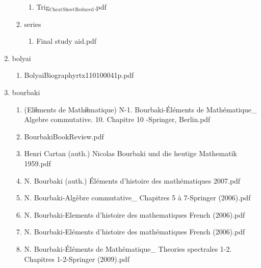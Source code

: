 \documentclass[11pt]{article}
\begin{document}
\begin{enumerate}
\begin{enumerate}
\begin{enumerate}
\item Trig$_{\text{Cheat}}$$_{\text{Sheet}}$$_{\text{Reduced}}$.pdf
\label{sec-1-1-1-1-29-22-20-15}
\end{enumerate}

\item series
\label{sec-1-1-1-1-29-22-21}
\begin{enumerate}
\item Final study aid.pdf
\label{sec-1-1-1-1-29-22-21-1}
\end{enumerate}
\end{enumerate}

\item bolyai
\label{sec-1-1-1-1-29-23}
\begin{enumerate}
\item BolyaiBiographyrtx110100041p.pdf
\label{sec-1-1-1-1-29-23-1}
\end{enumerate}

\item bourbaki
\label{sec-1-1-1-1-29-24}
\begin{enumerate}
\item (Elйments de Mathйmatique) N-1. Bourbaki-Éléments de Mathématique\_ Algebre commutative. 10. Chapitre 10 -Springer, Berlin.pdf
\label{sec-1-1-1-1-29-24-1}

\item BourbakiBookReview.pdf
\label{sec-1-1-1-1-29-24-2}

\item Henri Cartan  (auth.) Nicolas Bourbaki und die heutige Mathematik  1959.pdf
\label{sec-1-1-1-1-29-24-3}

\item N. Bourbaki  (auth.) Éléments d'histoire des mathématiques  2007.pdf
\label{sec-1-1-1-1-29-24-4}

\item N. Bourbaki-Algèbre commutative\_ Chapitres 5 à 7-Springer (2006).pdf
\label{sec-1-1-1-1-29-24-5}

\item N. Bourbaki-Elements d'histoire des mathematiques  French (2006).pdf
\label{sec-1-1-1-1-29-24-6}

\item N. Bourbaki-Eléments d'histoire des mathématiques  French (2006).pdf
\label{sec-1-1-1-1-29-24-7}

\item N. Bourbaki-Éléments de Mathématique\_ Theories spectrales 1-2. Chapitres 1-2-Springer (2009).pdf
\label{sec-1-1-1-1-29-24-8}


\end{enumerate}
\end{enumerate}
\end{document}
